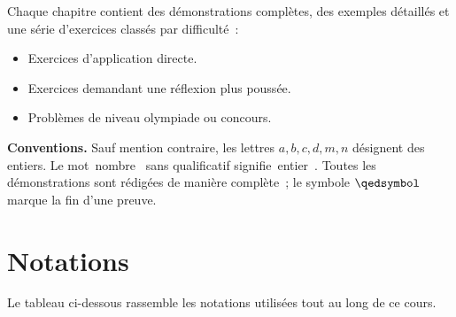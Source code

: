 \documentclass[12pt,a4paper,openany]{book}
\theoremstyle{definition}
\theoremstyle{plain}
\theoremstyle{remark}
\providecommand{\og}{\guillemotleft\,}
\providecommand{\fg}{\,\guillemotright}
\begin{document}
Chaque chapitre contient des démonstrations complètes, des exemples détaillés et
une série d'exercices classés par difficulté~:
\begin{itemize}[leftmargin=2cm]
  \item[$\star$] Exercices d'application directe.
  \item[$\star\star$] Exercices demandant une réflexion plus poussée.
  \item[$\star\star\star$] Problèmes de niveau olympiade ou concours.
\end{itemize}

\medskip

\noindent\textbf{Conventions.}
Sauf mention contraire, les lettres $a, b, c, d, m, n$ désignent des entiers. Le
mot \og nombre \fg{} sans qualificatif signifie \og entier \fg{}. Toutes les
démonstrations sont rédigées de manière complète~; le symbole $\qedsymbol$ marque
la fin d'une preuve.

\newpage

\chapter*{Notations}
\label{sec:notations}


Le tableau ci-dessous rassemble les notations utilisées tout au long de ce cours.

\bigskip
\end{document}
